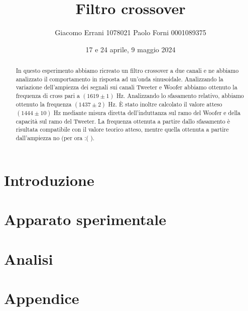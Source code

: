 \documentclass[12pt,a4paper]{article}
\title{Filtro crossover} %
\date{17 e 24 aprile, 9 maggio 2024}
\author{Giacomo Errani 1078021 Paolo Forni 0001089375}
\begin{document}
\newcommand{\numberthis}{\addtocounter{equation}{1}\tag{\theequatio}}

\newcommand{\theoryF}{ $(1444 \pm 10)$ Hz}
\newcommand{\amplitudeF}{$(1619 \pm 1)$ Hz}
\newcommand{\phaseF}{$(1437 \pm 2)$ Hz}

\maketitle

\begin{abstract}

In questo esperimento abbiamo ricreato un filtro crossover a due canali e ne abbiamo analizzato il comportamento
in risposta ad un'onda sinusoidale. Analizzando la variazione dell'ampiezza dei segnali sui canali Tweeter e Woofer
abbiamo ottenuto la frequenza di cross pari a \amplitudeF. Analizzando lo sfasamento relativo, abbiamo ottenuto la
frequenza \phaseF. È stato inoltre calcolato il valore atteso \theoryF \hspace{1pt}
mediante misura diretta dell'induttanza sul ramo del Woofer e della capacità sul ramo del Tweeter.
La frequenza ottenuta a partire dallo sfasamento è risultata compatibile con il valore teorico atteso, mentre quella
ottenuta a partire dall'ampiezza no (per ora :( ).

\end{abstract}

\section{Introduzione}\label{sec:introduzione}

    

\section{Apparato sperimentale}\label{sec:apparato-sperimentale}

    

\section{Analisi}\label{sec:analisi}

    

\appendix

\section*{Appendice}
\end{document}
